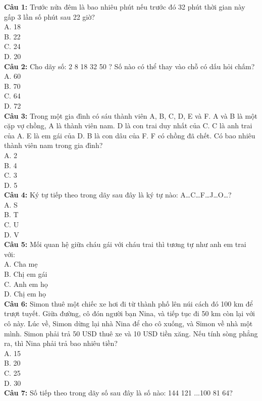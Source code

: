\begin{multicols}{2}
\noindent
\textbf{Câu 1:} Trước nửa đêm là bao nhiêu phút nếu trước đó 32 phút thời gian này gấp 3 lần số phút sau 22 giờ? \\
A. 18 \\
B. 22 \\
C. 24 \\
D. 20 \\
\textbf{Câu 2:} Cho dãy số: 2 8 18 32 50 ? Số nào có thể thay vào chỗ có dấu hỏi chấm? \\
A. 60 \\
B. 70 \\
C. 64 \\
D. 72 \\
\textbf{Câu 3:} Trong một gia đình có sáu thành viên A, B, C, D, E và F. A và B là một cặp vợ chồng, A là thành viên nam. D là con trai duy nhất của C. C là anh trai của A. E là em gái của D. B là con dâu của F. F có chồng đã chết. Có bao nhiêu thành viên nam trong gia đình? \\
A. 2 \\
B. 4 \\
C. 3 \\
D. 5 \\
\textbf{Câu 4:} Ký tự tiếp theo trong dãy sau đây là ký tự nào: A…C…F…J…O…? \\
A. S \\
B. T \\
C. U \\
D. V \\
\textbf{Câu 5:} Mối quan hệ giữa cháu gái với cháu trai thì tương tự như anh em trai với: \\
A. Cha mẹ \\
B. Chị em gái \\
C. Anh em họ \\
D. Chị em họ \\
\textbf{Câu 6:} Simon thuê một chiếc xe hơi đi từ thành phố lên núi cách đó 100 km để trượt tuyết. Giữa đường, cô đón người bạn Nina, và tiếp tục đi 50 km còn lại với cô này. Lúc về, Simon dừng lại nhà Nina để cho cô xuống, và Simon về nhà một mình. Simon phải trả 50 USD thuê xe và 10 USD tiền xăng. Nếu tính sòng phẳng ra, thì Nina phải trả bao nhiêu tiền? \\
A. 15 \\
B. 20 \\
C. 25 \\
D. 30 \\
\textbf{Câu 7:} Số tiếp theo trong dãy số sau đây là số nào: 144 121 ...100 81 64? \\

\end{multicols}
